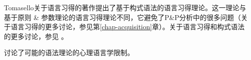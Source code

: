 {Tomasello关于语言习得的著作\citep{Tomasello2000a,Tomasello2003a,Tomasello2005a,Tomasello2006a}\nocite{Tomasello95a}提出了基于构式语法的语言习得理论。这一理论与基于原则 \& 参数理论的语言习得理论不同，它避免了P\&P分析中的很多问题（关于语言习得的更多讨论，参见第\ref{chap-acquisition}章）。关于语言习得和构式语法的更多讨论，参见 。

\citet{Dabrowska2004a}讨论了可能的语法理论的心理语言学限制。  
}



